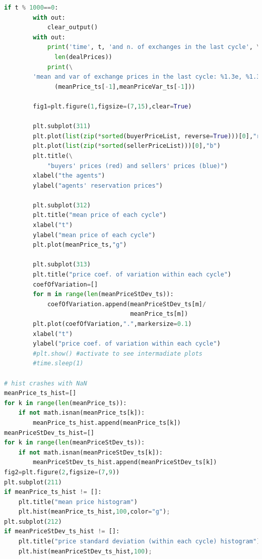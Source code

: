 \documentclass[10pt]{report}
\begin{document}
\begin{appendices}
\begin{lstlisting}[language=Python, caption=The model in the corrupted simplified Hayekian perspective, 
label={The listing of model in the corrupted simplified Hayekian perspective},basicstyle=\ttfamily\footnotesize]
    if t % 1000==0:
        with out:
            clear_output()
        with out:
            print('time', t, 'and n. of exchanges in the last cycle', \
              len(dealPrices))
            print(\
        'mean and var of exchange prices in the last cycle: %1.3e, %1.3e' %\
              (meanPrice_ts[-1],meanPriceVar_ts[-1]))

        fig1=plt.figure(1,figsize=(7,15),clear=True)

        plt.subplot(311)
        plt.plot(list(zip(*sorted(buyerPriceList, reverse=True)))[0],"r")
        plt.plot(list(zip(*sorted(sellerPriceList)))[0],"b")
        plt.title(\
            "buyers' prices (red) and sellers' prices (blue)")
        xlabel("the agents")
        ylabel("agents' reservation prices")

        plt.subplot(312)
        plt.title("mean price of each cycle")
        xlabel("t")
        ylabel("mean price of each cycle")
        plt.plot(meanPrice_ts,"g")
        
        plt.subplot(313)
        plt.title("price coef. of variation within each cycle")
        coefOfVariation=[]
        for m in range(len(meanPriceStDev_ts)):
            coefOfVariation.append(meanPriceStDev_ts[m]/
                                   meanPrice_ts[m])
        plt.plot(coefOfVariation,".",markersize=0.1)
        xlabel("t")
        ylabel("price coef. of variation within each cycle")
        #plt.show() #activate to see intermadiate plots
        #time.sleep(1)
        
# hist crashes with NaN
meanPrice_ts_hist=[]
for k in range(len(meanPrice_ts)): 
    if not math.isnan(meanPrice_ts[k]):
        meanPrice_ts_hist.append(meanPrice_ts[k])
meanPriceStDev_ts_hist=[]
for k in range(len(meanPriceStDev_ts)): 
    if not math.isnan(meanPriceStDev_ts[k]):
        meanPriceStDev_ts_hist.append(meanPriceStDev_ts[k])
fig2=plt.figure(2,figsize=(7,9))
plt.subplot(211)
if meanPrice_ts_hist != []:
    plt.title("mean price histogram")
    plt.hist(meanPrice_ts_hist,100,color="g");
plt.subplot(212)
if meanPriceStDev_ts_hist != []:
    plt.title("price standard deviation (within each cycle) histogram")
    plt.hist(meanPriceStDev_ts_hist,100);
\end{lstlisting}








\end{appendices}
\end{document}
